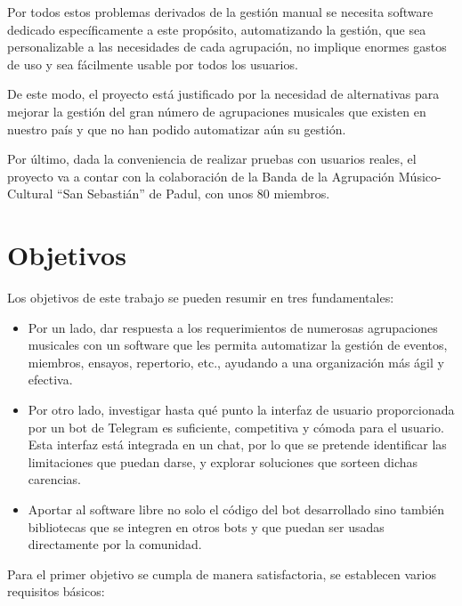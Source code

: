 Por todos estos problemas derivados de la gestión manual se necesita software dedicado específicamente a este propósito, automatizando la gestión, que sea personalizable a las necesidades de cada agrupación, no implique enormes gastos de uso y sea fácilmente usable por todos los usuarios.

De este modo, el proyecto está justificado por la necesidad de alternativas para mejorar la gestión del gran número de agrupaciones musicales que existen en nuestro país y que no han podido automatizar aún su gestión.

Por último, dada la conveniencia de realizar pruebas con usuarios reales, el proyecto va a contar con la colaboración de la Banda de la Agrupación Músico-Cultural ``San Sebastián'' de Padul, con unos 80 miembros.

\section{Objetivos}


Los objetivos de este trabajo se pueden resumir en tres fundamentales:

\begin{itemize}
    \item Por un lado, dar respuesta a los requerimientos de numerosas agrupaciones musicales con un software que les permita automatizar la gestión de eventos, miembros, ensayos, repertorio, etc., ayudando a una organización más ágil y efectiva.
    \item Por otro lado, investigar hasta qué punto la interfaz de usuario proporcionada por un bot de Telegram es suficiente, competitiva y cómoda para el usuario. Esta interfaz está integrada en un chat, por lo que se pretende identificar las limitaciones que puedan darse, y explorar soluciones que sorteen dichas carencias.
    \item Aportar al software libre no solo el código del bot desarrollado sino también bibliotecas que se integren en otros bots y que puedan ser usadas directamente por la comunidad.
\end{itemize}

Para el primer objetivo se cumpla de manera satisfactoria, se establecen varios requisitos básicos:

